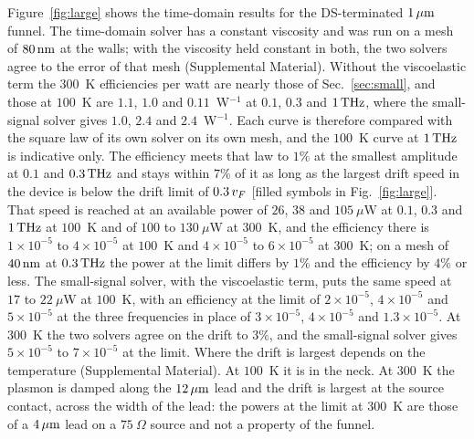 Figure~\ref{fig:large} shows the time-domain results for the DS-terminated
$1\,\mu\mathrm{m}$ funnel. The time-domain solver has a constant viscosity and was
run on a mesh of $80\,\mathrm{nm}$ at the walls; with the viscosity held constant
in both, the two solvers agree to the error of that mesh (Supplemental
Material). Without the viscoelastic term the $300$~K efficiencies per
watt are nearly those of Sec.~\ref{sec:small}, and those at $100$~K are
$1.1$, $1.0$ and $0.11$~W$^{-1}$ at $0.1$, $0.3$ and $1\,\mathrm{THz}$, where the
small-signal solver gives $1.0$, $2.4$ and $2.4$~W$^{-1}$. Each curve is
therefore compared with the square law of its own solver on its own
mesh, and the $100$~K curve at $1\,\mathrm{THz}$ is indicative only. The
efficiency meets that law to $1\%$ at the smallest amplitude at $0.1$ and
$0.3\,\mathrm{THz}$ and stays within $7\%$ of it as long as the largest drift speed
in the device is below the drift limit of $0.3\,v_{F}$
[filled symbols in Fig.~\ref{fig:large}]. That speed is reached at an
available power of $26$, $38$ and $105\ \mu$W at $0.1$, $0.3$ and $1\,\mathrm{THz}$
at $100$~K and of $100$ to $130\ \mu$W at $300$~K, and the efficiency
there is $1\times10^{-5}$ to $4\times10^{-5}$ at $100$~K and
$4\times10^{-5}$ to $6\times10^{-5}$ at $300$~K; on a mesh of $40\,\mathrm{nm}$ at
$0.3\,\mathrm{THz}$ the power at the limit differs by $1\%$ and the efficiency by
$4\%$ or less. The small-signal solver, with the viscoelastic term, puts
the same speed at $17$ to $22\ \mu$W at $100$~K, with an efficiency at
the limit of $2\times10^{-5}$, $4\times10^{-5}$ and $5\times10^{-5}$ at
the three frequencies in place of $3\times10^{-5}$, $4\times10^{-5}$ and
$1.3\times10^{-5}$. At $300$~K the two solvers agree on the drift to
$3\%$, and the small-signal solver gives $5\times10^{-5}$ to
$7\times10^{-5}$ at the limit. Where the drift is largest depends on the
temperature (Supplemental Material). At $100$~K it is in the neck. At
$300$~K the plasmon is damped along the $12\,\mu\mathrm{m}$ lead and the drift is
largest at the source contact, across the width of the lead: the powers
at the limit at $300$~K are those of a $4\,\mu\mathrm{m}$ lead on a $75\ \Omega$
source and not a property of the funnel.

